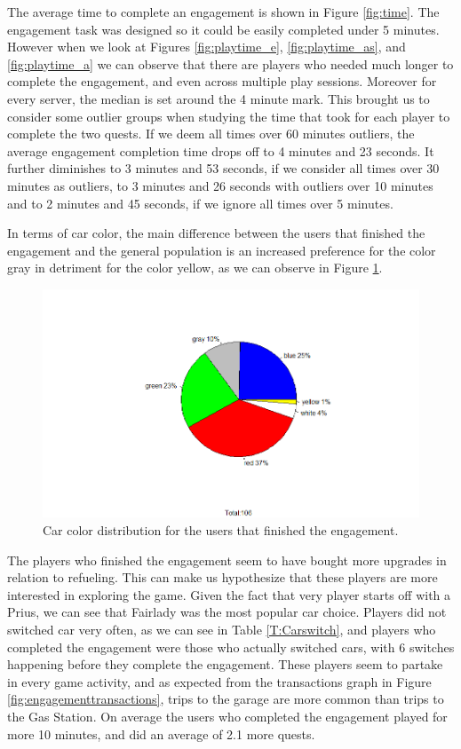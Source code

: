 \documentclass[preprint,authoryear,12pt]{elsarticle}
\begin{document}
The average time to complete an engagement is shown in Figure \ref{fig:time}. The engagement task was designed so it could be easily completed under 5 minutes.
However when we look at Figures \ref{fig:playtime_e}, \ref{fig:playtime_as}, and \ref{fig:playtime_a} we can observe that there are players who needed much longer to complete the engagement, and even across multiple play sessions. Moreover for every server, the median is set around the 4 minute mark. This brought us to consider some outlier groups when studying the time that took for each player to complete the two quests.
If we deem all times over 60 minutes outliers, the average engagement completion time drops off to 4 minutes and 23 seconds. It further diminishes to 3 minutes and 53 seconds, if we consider all times over 30 minutes as outliers, to 3 minutes and 26 seconds with outliers over 10 minutes and to 2 minutes and 45 seconds, if we ignore all times over 5 minutes.

In terms of car color, the main difference between the users that finished the engagement and the general population is an increased preference for the color gray in detriment for the color yellow, as we can observe in Figure \ref{fig:engagementcolor}.

\begin{figure}[htb]
	\begin{center}
		\includegraphics[width=.95\linewidth]{ijhcs14-img/Color}
		\caption{Car color distribution for the users that finished the engagement.\label{fig:engagementcolor}}
	\end{center}
\end{figure}

The players who finished the engagement seem to have bought more upgrades in relation to refueling. This can make us hypothesize that these players are more interested in exploring the game.
Given the fact that very player starts off with a Prius, we can see that Fairlady was the most popular car choice. Players did not switched car very often, as we can see in Table \ref{T:Carswitch}, and players who completed the engagement were those who actually switched cars, with 6 switches happening before they complete the engagement. 
These players seem to partake in every game activity, and as expected from the transactions graph in Figure \ref{fig:engagementtransactions}, trips to the garage are more common than trips to the Gas Station.
On average the users who completed the engagement played for more 10 minutes, and did an average of 2.1 more quests.
\end{document}
